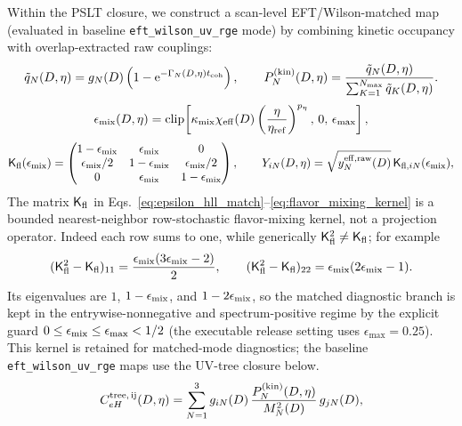 \documentclass[aps,prd,onecolumn,notitlepage,nofootinbib,superscriptaddress,11pt,floatfix]{revtex4-2}
\newcommand{\ee}{\mathrm{e}}
\begin{document}
Within the PSLT closure, we construct a scan-level EFT/Wilson-matched map (evaluated in baseline \texttt{eft\_wilson\_uv\_rge} mode) by combining kinetic occupancy with overlap-extracted raw couplings:
\begin{equation}
\tilde q_N(D,\eta)=g_N(D)\left(1-\ee^{-\Gamma_N(D,\eta)t_{\rm coh}}\right),\qquad
P_N^{\rm(kin)}(D,\eta)=\frac{\tilde q_N(D,\eta)}{\sum_{K=1}^{N_{\max}}\tilde q_K(D,\eta)}.
\label{eq:kin_occupancy}
\end{equation}
\begin{equation}
\epsilon_{\rm mix}(D,\eta)=\mathrm{clip}\!\left[\kappa_{\rm mix}\chi_{\rm eff}(D)\left(\frac{\eta}{\eta_{\rm ref}}\right)^{p_\eta},\,0,\,\epsilon_{\max}\right],
\label{eq:epsilon_hll_match}
\end{equation}
\begin{equation}
\mathsf K_{\rm fl}(\epsilon_{\rm mix})=
\begin{pmatrix}
1-\epsilon_{\rm mix} & \epsilon_{\rm mix} & 0\\
\epsilon_{\rm mix}/2 & 1-\epsilon_{\rm mix} & \epsilon_{\rm mix}/2\\
0 & \epsilon_{\rm mix} & 1-\epsilon_{\rm mix}
\end{pmatrix},
\qquad
Y_{iN}(D,\eta)=\sqrt{y_N^{\rm eff,raw}(D)}\,\mathsf K_{{\rm fl},iN}(\epsilon_{\rm mix}),
\label{eq:flavor_mixing_kernel}
\end{equation}
The matrix \(\mathsf K_{\rm fl}\) in Eqs.~\eqref{eq:epsilon_hll_match}--\eqref{eq:flavor_mixing_kernel} is a bounded nearest-neighbor row-stochastic flavor-mixing kernel, not a projection operator.
Indeed each row sums to one, while generically \(\mathsf K_{\rm fl}^2\neq \mathsf K_{\rm fl}\); for example
\[
(\mathsf K_{\rm fl}^2-\mathsf K_{\rm fl})_{11}
=\frac{\epsilon_{\rm mix}(3\epsilon_{\rm mix}-2)}{2},
\qquad
(\mathsf K_{\rm fl}^2-\mathsf K_{\rm fl})_{22}
=\epsilon_{\rm mix}(2\epsilon_{\rm mix}-1).
\]
Its eigenvalues are \(1\), \(1-\epsilon_{\rm mix}\), and \(1-2\epsilon_{\rm mix}\), so the matched diagnostic branch is kept in the entrywise-nonnegative and spectrum-positive regime by the explicit guard \(0\le\epsilon_{\rm mix}\le\epsilon_{\max}<1/2\) (the executable release setting uses \(\epsilon_{\max}=0.25\)).
This kernel is retained for matched-mode diagnostics; the baseline \texttt{eft\_wilson\_uv\_rge} maps use the UV-tree closure below.
\begin{equation}
C_{eH}^{\rm tree,\,ij}(D,\eta)=\sum_{N=1}^{3}g_{iN}(D)\,
\frac{P_N^{\rm(kin)}(D,\eta)}{M_N^2(D)}\,g_{jN}(D),
\label{eq:wilson_tree_uv}
\end{equation}
\end{document}
